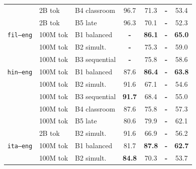 \documentclass[11pt]{article}
\begin{document}
\begin{table}[ht!]
\begin{minipage}[t]{0.49\linewidth}
\begin{tabular}{ll l cc cc}
 & 2B tok & B4 classroom & \cellcolor[rgb]{0.742,1.000,0.742} 96.7 & \cellcolor[rgb]{0.884,1.000,0.884} 71.3 & \textbf{-} & \cellcolor[rgb]{0.972,1.000,0.972} 53.4 \\
 & 2B tok & B5 late & \cellcolor[rgb]{0.744,1.000,0.744} 96.3 & \cellcolor[rgb]{0.890,1.000,0.890} 70.1 & \textbf{-} & \cellcolor[rgb]{0.981,1.000,0.981} 52.3 \\
\midrule
\texttt{fil--eng} & 100M tok & B1 balanced & \textbf{-} & \cellcolor[rgb]{0.803,1.000,0.803} \textbf{86.1} & \textbf{-} & \cellcolor[rgb]{0.877,1.000,0.877} \textbf{65.0} \\
 & 100M tok & B2 simult. & \textbf{-} & \cellcolor[rgb]{0.862,1.000,0.862} 75.3 & \textbf{-} & \cellcolor[rgb]{0.926,1.000,0.926} 59.0 \\
 & 100M tok & B3 sequential & \textbf{-} & \cellcolor[rgb]{0.859,1.000,0.859} 75.8 & \textbf{-} & \cellcolor[rgb]{0.929,1.000,0.929} 58.6 \\
\midrule
\texttt{hin--eng} & 100M tok & B1 balanced & \cellcolor[rgb]{0.792,1.000,0.792} 87.6 & \cellcolor[rgb]{0.801,1.000,0.801} \textbf{86.4} & \textbf{-} & \cellcolor[rgb]{0.886,1.000,0.886} \textbf{63.8} \\
 & 100M tok & B2 simult. & \cellcolor[rgb]{0.770,1.000,0.770} 91.6 & \cellcolor[rgb]{0.907,1.000,0.907} 67.1 & \textbf{-} & \cellcolor[rgb]{0.962,1.000,0.962} 54.6 \\
 & 100M tok & B3 sequential & \cellcolor[rgb]{0.769,1.000,0.769} \textbf{91.7} & \cellcolor[rgb]{0.900,1.000,0.900} 68.4 & \textbf{-} & \cellcolor[rgb]{0.959,1.000,0.959} 55.0 \\
 & 100M tok & B4 classroom & \cellcolor[rgb]{0.792,1.000,0.792} 87.6 & \cellcolor[rgb]{0.859,1.000,0.859} 75.8 & \textbf{-} & \cellcolor[rgb]{0.940,1.000,0.940} 57.3 \\
 & 100M tok & B5 late & \cellcolor[rgb]{0.831,1.000,0.831} 80.6 & \cellcolor[rgb]{0.837,1.000,0.837} 79.9 & \textbf{-} & \cellcolor[rgb]{0.900,1.000,0.900} 62.1 \\
\addlinespace[1.5pt]
 & 2B tok & B2 simult. & \cellcolor[rgb]{0.770,1.000,0.770} 91.6 & \cellcolor[rgb]{0.908,1.000,0.908} 66.9 & \textbf{-} & \cellcolor[rgb]{0.949,1.000,0.949} 56.2 \\
\midrule
\texttt{ita--eng} & 100M tok & B1 balanced & \cellcolor[rgb]{0.825,1.000,0.825} 81.7 & \cellcolor[rgb]{0.794,1.000,0.794} \textbf{87.8} & \textbf{-} & \cellcolor[rgb]{0.895,1.000,0.895} \textbf{62.7} \\
 & 100M tok & B2 simult. & \cellcolor[rgb]{0.807,1.000,0.807} \textbf{84.8} & \cellcolor[rgb]{0.889,1.000,0.889} 70.3 & \textbf{-} & \cellcolor[rgb]{0.970,1.000,0.970} 53.7 \\

\end{tabular}
\end{minipage}
\end{table}
\end{document}
